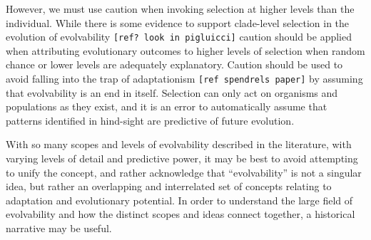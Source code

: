 However, we must use caution when invoking selection at higher levels than the individual. While there is some evidence to support clade-level selection in the evolution of evolvability \verb|[ref? look in pigluicci]| caution should be applied when attributing evolutionary outcomes to higher levels of selection when random chance or  lower levels are adequately explanatory. Caution should be used to avoid falling into the trap of adaptationism \verb|[ref spendrels paper]| by assuming that evolvability is an end in itself. Selection can only act on organisms and populations as they exist, and it is an error to automatically assume that patterns identified in hind-sight are predictive of future evolution.

With so many scopes and levels of evolvability described in the literature, with varying levels of detail and predictive power, it may be best to avoid attempting to unify the concept, and rather acknowledge that “evolvability” is not a singular idea, but rather an overlapping and interrelated set of concepts relating to adaptation and evolutionary potential. In order to understand the large field of evolvability and how the distinct scopes and ideas connect together, a historical narrative may be useful.

